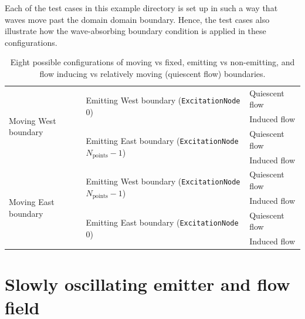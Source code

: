 Each of the test cases in this example directory is set up in such a way that waves move past the domain domain boundary. Hence, the test cases also illustrate how the wave-absorbing boundary condition is applied in these configurations.


\begin{table}[htb]
    \centering
    \begin{tabular}{|l|l|l|}
        \hline
        \multirow{4}{*}{Moving West boundary} & \multirow{2}{*}{Emitting West boundary ({\tt ExcitationNode} 0)}                       & Quiescent flow \\
        \cline{3-3}
                                              &                                                                                        & Induced flow   \\
        \cline{2-3}
                                              & \multirow{2}{*}{Emitting East boundary ({\tt ExcitationNode} $N_{\mathrm{points}}-1$)} & Quiescent flow \\
        \cline{3-3}
                                              &                                                                                        & Induced flow   \\
        \cline{1-3}
        \multirow{4}{*}{Moving East boundary} & \multirow{2}{*}{Emitting West boundary ({\tt ExcitationNode} $N_{\mathrm{points}}-1$)} & Quiescent flow \\
        \cline{3-3}
                                              &                                                                                        & Induced flow   \\
        \cline{2-3}
                                              & \multirow{2}{*}{Emitting East boundary ({\tt ExcitationNode} $0$)}                     & Quiescent flow \\
        \cline{3-3}
                                              &                                                                                        & Induced flow   \\
        \hline
    \end{tabular}
    \caption{Eight possible configurations of moving vs fixed, emitting vs non-emitting, and flow inducing vs relatively moving (quiescent flow) boundaries.}
    \label{tab:hierarchyMotion}
\end{table}


\section{Slowly oscillating emitter and flow field}
\label{sec:Slowly oscillating emitter and flow field}


